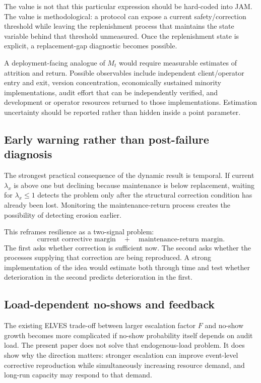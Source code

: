 The value is not that this particular expression should be hard-coded into JAM. The value is methodological: a protocol can expose a current safety/correction threshold while leaving the replenishment process that maintains the state variable behind that threshold unmeasured. Once the replenishment state is explicit, a replacement-gap diagnostic becomes possible.

A deployment-facing analogue of $M_t$ would require measurable estimates of attrition and return. Possible observables include independent client/operator entry and exit, version concentration, economically sustained minority implementations, audit effort that can be independently verified, and development or operator resources returned to those implementations. Estimation uncertainty should be reported rather than hidden inside a point parameter.

\subsection{Early warning rather than post-failure diagnosis}

The strongest practical consequence of the dynamic result is temporal. If current $\lambda_x$ is above one but declining because maintenance is below replacement, waiting for $\lambda_x\le1$ detects the problem only after the structural correction condition has already been lost. Monitoring the maintenance-return process creates the possibility of detecting erosion earlier.

This reframes resilience as a two-signal problem:
\[
\text{current corrective margin}
\quad+\quad
\text{maintenance-return margin}.
\]
The first asks whether correction is sufficient now. The second asks whether the processes supplying that correction are being reproduced. A strong implementation of the idea would estimate both through time and test whether deterioration in the second predicts deterioration in the first.

\subsection{Load-dependent no-shows and feedback}

The existing ELVES trade-off between larger escalation factor $F$ and no-show growth becomes more complicated if no-show probability itself depends on audit load. The present paper does not solve that endogenous-load problem. It does show why the direction matters: stronger escalation can improve event-level corrective reproduction while simultaneously increasing resource demand, and long-run capacity may respond to that demand.

